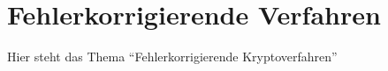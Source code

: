 \section{Fehlerkorrigierende Verfahren}

Hier steht das Thema \enquote{Fehlerkorrigierende Kryptoverfahren}